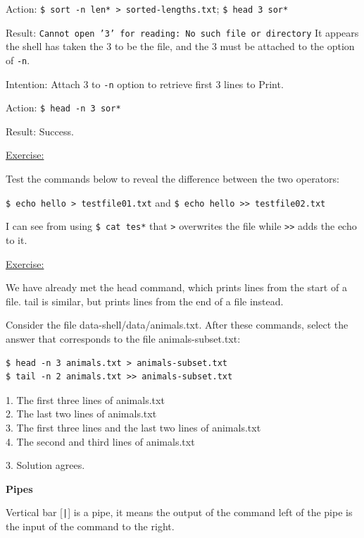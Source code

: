 \documentclass[12pt]{article}
\begin{document}
Action: \texttt{\$ sort -n len* > sorted-lengths.txt}; \texttt{\$ head 3 sor*}

Result: \texttt{Cannot open '3' for reading: No such file or directory} It appears the shell has taken the 3 to be the file, and the 3 must be attached to the option of \texttt{-n}.

Intention: Attach 3 to \texttt{-n} option to retrieve first 3 lines to Print.

Action: \texttt{\$ head -n 3 sor*}

Result: Success.

\begin{addmargin}[1cm]{0cm}
\color{gray}
\underline{Exercise:}

Test the commands below to reveal the difference between the two operators:

\texttt{\$ echo hello > testfile01.txt} and \texttt{\$ echo hello >> testfile02.txt}

\color{black}
I can see from using \texttt{\$ cat tes*} that \texttt{>} overwrites the file while \texttt{>>} adds the echo to it.
\end{addmargin}

\newpage
\begin{addmargin}[1cm]{0cm}
\color{gray}
\vspace{1em}\underline{Exercise:}

We have already met the head command, which prints lines from the start of a file. tail is similar, but prints lines from the end of a file instead.

Consider the file data-shell/data/animals.txt. After these commands, select the answer that corresponds to the file animals-subset.txt:
\begin{verbatim}
$ head -n 3 animals.txt > animals-subset.txt
$ tail -n 2 animals.txt >> animals-subset.txt
\end{verbatim}
1. The first three lines of animals.txt
\\2. The last two lines of animals.txt
\\3. The first three lines and the last two lines of animals.txt
\\4. The second and third lines of animals.txt

\vspace{1em}
\color{black}

3. Solution agrees.
\end{addmargin}

\textbf{Pipes}

Vertical bar [\texttt{|}] is a pipe, it means the  output of the command left of the pipe is the input of the command to the right.
\end{document}
